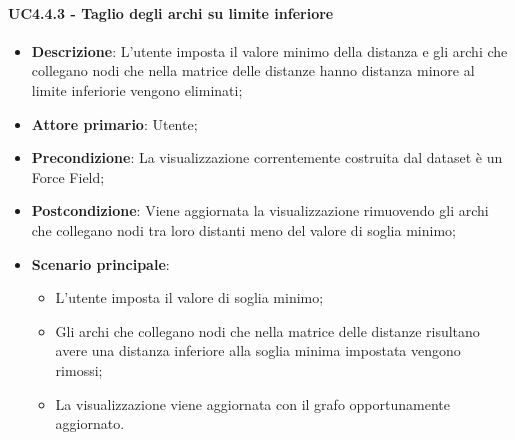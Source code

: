 \paragraph{UC4.4.3 - Taglio degli archi su limite inferiore}
\label{par:uc4.4.3}
\begin{itemize}
    \item \textbf{Descrizione}:     L'utente imposta il valore minimo della distanza e gli archi che collegano nodi che nella matrice delle distanze hanno distanza minore al limite inferiorie vengono eliminati;
    \item \textbf{Attore primario}: Utente;
    \item \textbf{Precondizione}:   La visualizzazione correntemente costruita dal dataset è un Force Field;
    \item \textbf{Postcondizione}:  Viene aggiornata la visualizzazione rimuovendo gli archi  che collegano nodi tra loro distanti meno del valore di soglia minimo;
    \item \textbf{Scenario principale}:
    \begin{itemize}
        \item L'utente imposta il valore di soglia minimo;
        \item Gli archi che collegano nodi che nella matrice delle distanze risultano avere una distanza inferiore alla soglia minima impostata vengono rimossi;
        \item La visualizzazione viene aggiornata con il grafo opportunamente aggiornato.
    \end{itemize}
\end{itemize}

